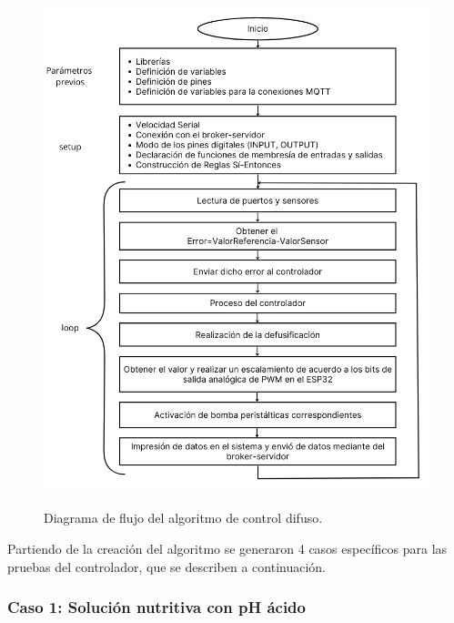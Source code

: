 \begin{figure}[H]
\centering
         \includegraphics[scale=0.68]{imgs/Flujo (4).png} \\
    \caption{Diagrama de flujo del algoritmo de control difuso.}\label{flujo}
\end{figure}

Partiendo de la creación del algoritmo se generaron 4 casos específicos para las pruebas del controlador, que se describen a continuación. 

\subsubsection{Caso 1: Solución nutritiva con pH ácido}

